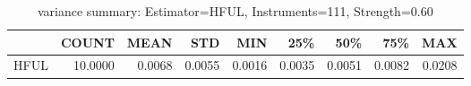 \begin{table}[ht]
\centering
\caption{variance summary: Estimator=HFUL, Instruments=111, Strength=0.60}
\begin{tabular}{lrrrrrrrr}
\toprule
 & COUNT & MEAN & STD & MIN & 25\% & 50\% & 75\% & MAX \\
\midrule
HFUL & 10.0000 & 0.0068 & 0.0055 & 0.0016 & 0.0035 & 0.0051 & 0.0082 & 0.0208 \\
\bottomrule
\end{tabular}
\end{table}
